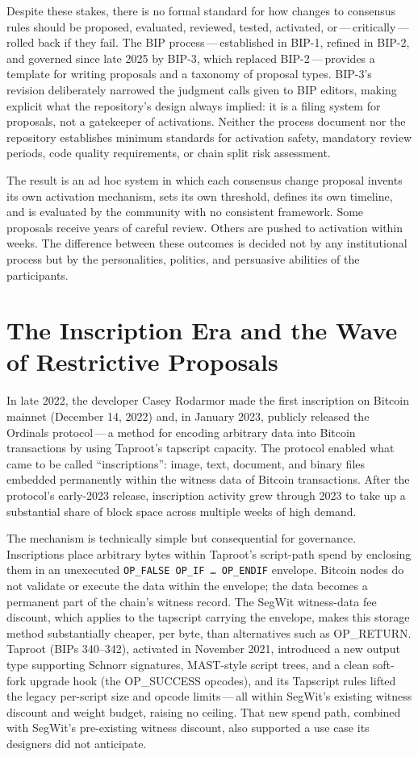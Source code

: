 \documentclass[11pt, twoside, openright]{book}
\begin{document}
Despite these stakes, there is no formal standard for how changes to consensus rules should be proposed, evaluated, reviewed, tested, activated, or\,---\,critically\,---\,rolled back if they fail. The BIP process\,---\,established in BIP-1, refined in BIP-2, and governed since late 2025 by BIP-3, which replaced BIP-2\,---\,provides a template for writing proposals and a taxonomy of proposal types. BIP-3's revision deliberately narrowed the judgment calls given to BIP editors, making explicit what the repository's design always implied: it is a filing system for proposals, not a gatekeeper of activations. Neither the process document nor the repository establishes minimum standards for activation safety, mandatory review periods, code quality requirements, or chain split risk assessment.

The result is an ad hoc system in which each consensus change proposal invents its own activation mechanism, sets its own threshold, defines its own timeline, and is evaluated by the community with no consistent framework. Some proposals receive years of careful review. Others are pushed to activation within weeks. The difference between these outcomes is decided not by any institutional process but by the personalities, politics, and persuasive abilities of the participants.

\section{The Inscription Era and the Wave of Restrictive Proposals}

In late 2022, the developer Casey Rodarmor made the first inscription on Bitcoin mainnet (December 14, 2022) and, in January 2023, publicly released the Ordinals protocol\,---\,a method for encoding arbitrary data into Bitcoin transactions by using Taproot's tapscript capacity. The protocol enabled what came to be called ``inscriptions'': image, text, document, and binary files embedded permanently within the witness data of Bitcoin transactions. After the protocol's early-2023 release, inscription activity grew through 2023 to take up a substantial share of block space across multiple weeks of high demand.

The mechanism is technically simple but consequential for governance. Inscriptions place arbitrary bytes within Taproot's script-path spend by enclosing them in an unexecuted \texttt{OP\_FALSE OP\_IF \ldots\ OP\_ENDIF} envelope. Bitcoin nodes do not validate or execute the data within the envelope; the data becomes a permanent part of the chain's witness record. The SegWit witness-data fee discount, which applies to the tapscript carrying the envelope, makes this storage method substantially cheaper, per byte, than alternatives such as OP\_RETURN. Taproot (BIPs 340--342), activated in November 2021, introduced a new output type supporting Schnorr signatures, MAST-style script trees, and a clean soft-fork upgrade hook (the OP\_SUCCESS opcodes), and its Tapscript rules lifted the legacy per-script size and opcode limits\,---\,all within SegWit's existing witness discount and weight budget, raising no ceiling. That new spend path, combined with SegWit's pre-existing witness discount, also supported a use case its designers did not anticipate.
\end{document}

